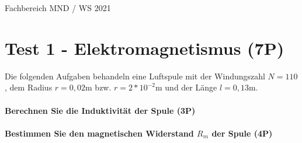 \documentclass{article}
\begin{document}
Fachbereich MND / WS 2021


\part*{Test 1 - Elektromagnetismus (7P)}

Die folgenden Aufgaben behandeln eine Luftspule mit der Windungszahl $N=110$, dem Radius $r=0{,}02$m bzw. $r=2*10^{ -2 }$m und der Länge $l=0{,}13$m.

\subsection*{Berechnen Sie die Induktivität der Spule (3P)}


\vspace{\baselineskip}\vspace{\baselineskip}\vspace{\baselineskip}

\subsection*{Bestimmen Sie den magnetischen Widerstand $R_{m}$ der Spule (4P)}


\vspace{\baselineskip}
\end{document}
